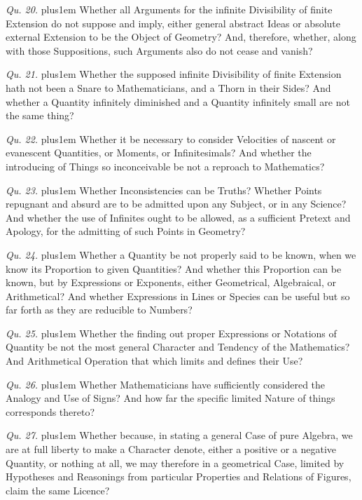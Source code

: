 \item{\it Qu. 20.} \hskip 0pt plus1em
Whether all Arguments for the infinite Divisibility of finite
Extension do not suppose and imply, either general abstract Ideas
or absolute external Extension to be the Object of Geometry?
And, therefore, whether, along with those Suppositions, such
Arguments also do not cease and vanish?

\item{\it Qu. 21.} \hskip 0pt plus1em
Whether the supposed infinite Divisibility of finite Extension
hath not been a Snare to Mathematicians, and a Thorn in their
Sides?  And whether a Quantity infinitely diminished and a
Quantity infinitely small are not the same thing?

\item{\it Qu. 22.} \hskip 0pt plus1em
Whether it be necessary to consider Velocities of nascent or
evanescent Quantities, or Moments, or Infinitesimals?  And
whether the introducing of Things so inconceivable be not a
reproach to Mathematics?

\item{\it Qu. 23.} \hskip 0pt plus1em
Whether Inconsistencies can be Truths?  Whether Points repugnant
and absurd are to be admitted upon any Subject, or in any
Science?  And whether the use of Infinites ought to be allowed,
as a sufficient Pretext and Apology, for the admitting of such
Points in Geometry?

\item{\it Qu. 24.} \hskip 0pt plus1em
Whether a Quantity be not properly said to be known, when we know
its Proportion to given Quantities?  And whether this Proportion
can be known, but by Expressions or Exponents, either
Geometrical, Algebraical, or Arithmetical?  And whether
Expressions in Lines or Species can be useful but so far forth as
they are reducible to Numbers?

\item{\it Qu. 25.} \hskip 0pt plus1em
Whether the finding out proper Expressions or Notations of
Quantity be not the most general Character and Tendency of the
Mathematics?  And Arithmetical Operation that which limits and
defines their Use?

\item{\it Qu. 26.} \hskip 0pt plus1em
Whether Mathematicians have sufficiently considered the Analogy
and Use of Signs?  And how far the specific limited Nature of
things corresponds thereto?

\item{\it Qu. 27.} \hskip 0pt plus1em
Whether because, in stating a general Case of pure Algebra, we
are at full liberty to make a Character denote, either a positive
or a negative Quantity, or nothing at all, we may therefore in a
geometrical Case, limited by Hypotheses and Reasonings from
particular Properties and Relations of Figures, claim the same
Licence?


